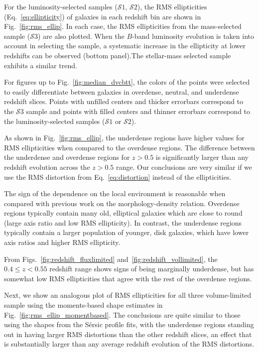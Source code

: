 \documentclass[twocolumn,useAMS,usenatbib]{mn2e}
\newcommand{\arun}[1]{{\textcolor{blue}{#1}}}
\newcommand{\sersic}{S\'{e}rsic }
\newcommand{\s}{\ensuremath{\mathcal{S}}}
\begin{document}
For the luminosity-selected samples (\s$1$, \s$2$), the
RMS ellipticities (Eq.~\ref{eq:ellipticity}) of galaxies in each redshift bin are shown
in Fig.~\ref{fig:rms_ellip}. In each case, the RMS ellipticities from the mass-selected sample (\s$3$) are also plotted.
When the $B$-band luminosity evolution is taken into account in selecting the sample, a systematic increase in the ellipticity at
lower redshifts can be observed (bottom panel).The stellar-mass selected sample exhibits a similar trend.


For figures up to Fig.~\ref{fig:median_dvcbtt}, the colors of the points were selected to easily differentiate between galaxies in overdense, neutral, and underdense redshift slices.
Points with unfilled centers and thicker errorbars correspond to the \s$3$ sample and points with filled centers and thinner errorbars correspond to the luminosity-selected samples (\s$1$ or \s$2$).

As shown in Fig.~\ref{fig:rms_ellip}, the underdense regions have  higher values for RMS ellipticities when compared to the
overdense regions. The difference between the underdense and overdense
regions for $z>0.5$ is significantly larger than any redshift
evolution across the $z>0.5$ range.  
Our conclusions are very similar if we use the RMS distortion from Eq.~\eqref{eq:distortion} instead
of the ellipticities.

The sign of the dependence on the local environment is reasonable when
compared with previous work on the morphology-density
relation. Overdense regions typically contain many old, elliptical
galaxies which are close to round (large axis ratio and low RMS ellipticity). 
In contrast, the underdense regions typically contain a larger
population of younger, disk galaxies, which have lower axis ratios and
higher RMS ellipticity.

From Figs.~\ref{fig:redshift_fluxlimited} and~\ref{fig:redshift_vollimited},
the $0.4\le z < 0.55$ redshift range shows signs of being marginally
underdense, but has somewhat low RMS ellipticities that agree with the rest of the overdense regions.

Next, we show an analogous plot of RMS ellipticities %
for all three
volume-limited sample using the moments-based shape estimates in
Fig.~\ref{fig:rms_ellip_momentbased}. The conclusions are quite
similar to those using the shapes from the \sersic profile fits, with
the underdense regions standing out in having larger RMS distortions 
than the other redshift slices, an effect that is substantially larger
than any average redshift evolution of the RMS distortions.
\end{document}
